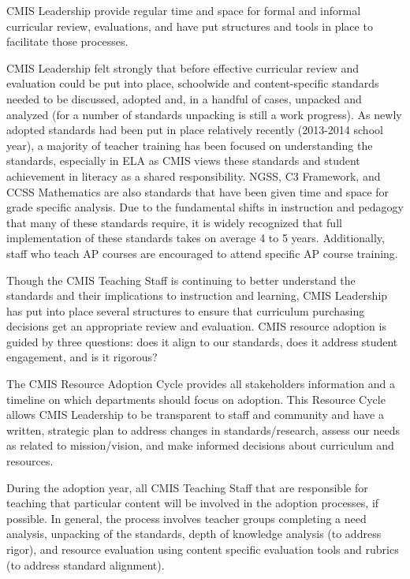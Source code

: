 \begin{findings}
CMIS Leadership provide regular time and space for formal and informal curricular review, evaluations, and have put structures and tools in place to facilitate those processes. 


CMIS Leadership felt strongly that before effective curricular review and evaluation could be put into place, schoolwide and content-specific standards needed to be discussed, adopted and, in a handful of cases, unpacked and analyzed (for a number of standards unpacking is still a work progress). As newly adopted standards had been  put in place relatively recently (2013-2014 school year), a majority of teacher training has been focused on understanding the standards, especially in ELA as CMIS views these standards and student achievement in literacy as a shared responsibility. NGSS, C3 Framework, and CCSS Mathematics are also standards that have been given time and space for grade specific analysis. Due to the fundamental shifts in instruction and pedagogy that many of these standards require, it is widely recognized that full implementation of these standards takes on average 4 to 5 years. Additionally, staff who teach AP courses are encouraged to attend specific AP course training. 

Though the CMIS Teaching Staff is continuing to better understand the standards and their implications to instruction and learning, CMIS Leadership has put into place several structures to ensure that curriculum purchasing decisions get an appropriate review and evaluation. CMIS resource adoption is guided by three questions: does it align to our standards, does it address student engagement, and is it rigorous?


The CMIS Resource Adoption Cycle provides all stakeholders information and a timeline on which departments should focus on adoption. This Resource Cycle allows CMIS Leadership to be transparent to staff and community and have a written, strategic plan to address changes in standards/research, assess our needs as related to mission/vision, and make informed decisions about curriculum and resources. 

During the adoption year, all CMIS Teaching Staff that are responsible for teaching that particular content will be involved in the adoption processes, if possible. In general, the process involves teacher groups completing a need analysis, unpacking of the standards, depth of knowledge analysis (to address rigor), and resource evaluation using content specific evaluation tools and rubrics (to address standard alignment). 


\end{findings}
